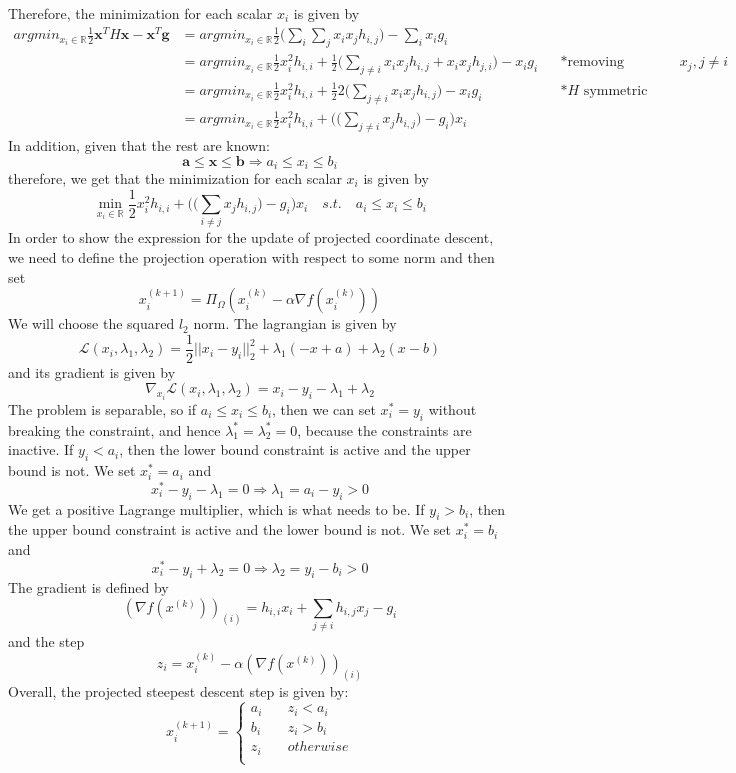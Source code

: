 \documentclass{article}
\begin{document}
\begin{enumerate}[(a)]
Therefore, the minimization for each scalar $x_i$ is given by
\begin{align*}
argmin_{x_i\in \mathbb{R}}\frac{1}{2}\mathbf{x}^TH \mathbf{x}-\mathbf{x}^T\mathbf{g}
&= argmin_{x_i\in \mathbb{R}}\frac{1}{2}\Big(\sum_i\sum_jx_ix_jh_{i,j}\Big)-\sum_ix_ig_i\\
&= argmin_{x_i\in \mathbb{R}}\frac{1}{2}x_i^2h_{i,i}+\frac{1}{2}\Big(\sum_{j\ne i}x_ix_jh_{i,j}+x_ix_jh_{j,i}\Big)-x_ig_i &&*\text{removing consants-$x_j, j\ne i$}\\
&= argmin_{x_i\in \mathbb{R}}\frac{1}{2}x_i^2h_{i,i}+\frac{1}{2}2\Big(\sum_{j\ne i}x_ix_jh_{i,j}\Big)-x_ig_i &&*\text{$H$ symmetric}\\
&= argmin_{x_i\in \mathbb{R}}\frac{1}{2}x_i^2h_{i,i}+\Big(\Big(\sum_{j\ne i}x_jh_{i,j}\Big)-g_i\Big)x_i
\end{align*}
In addition, given that the rest are known:
\[\mathbf{a}\le \mathbf{x}\le \mathbf{b} \Rightarrow a_i \le x_i \le b_i\]
therefore, we get  that the minimization for each scalar $x_i$ is given by
\[\min_{x_i\in \mathbb{R}}\frac{1}{2}x_i^2h_{i,i}+\Big(\Big(\sum_{i\ne j}x_jh_{i,j}\Big)-g_i\Big)x_i \quad s.t. \quad a_i \le x_i \le b_i\]
In order to show the expression for the update of projected coordinate descent, we need to define the projection operation with respect to some norm and then set
\[x_i^{(k+1)} = \Pi_\Omega (x_i^{(k)} -\alpha \nabla f(x_i^{(k)})) \]
We will choose the squared $l_2$ norm. The lagrangian is given by
\[\mathcal{L}(x_i, \lambda_1, \lambda_2) = \frac{1}{2}||x_i-y_i||_2^2+\lambda_1(-x+a)+\lambda_2(x-b)       \]
and its gradient is given by
\[  \nabla_{x_i} \mathcal{L}(x_i, \lambda_1, \lambda_2) = x_i-y_i -\lambda_1+\lambda_2     \]
The problem is separable, so if $a_i \le x_i \le b_i$, then we can set $x_i^* = y_i$ without breaking the constraint, and hence $\lambda_1^*=\lambda_2^*=0$, because the
constraints are inactive. If $y_i < a_i$, then the lower bound constraint is active and the upper bound is not. We set $x_i^* = a_i$ and
\[x_i^* - y_i-\lambda_1 = 0 \Rightarrow\lambda_1 = a_i-y_i > 0 \]
We get a positive Lagrange multiplier, which is what needs to be. If $y_i>b_i$, then the upper bound constraint is active and the lower bound is not. We set $x_i^* = b_i$ and
\[x_i^* - y_i+\lambda_2 = 0 \Rightarrow\lambda_2 = y_i-b_i > 0 \]
The gradient is defined by
\[(\nabla f (x^{(k)}))_{(i)} = h_{i,i}x_i+\sum_{j\ne i}  h_{i,j}x_j -g_i   \]
and the step
\[z_i =  x_i^{(k)}-\alpha (\nabla f (x^{(k)}))_{(i)}   \]
Overall, the projected steepest descent step is given by:
\[x_i^{(k+1)} =
\begin{cases}
a_i &\quad z_i <a_i\\
b_i &\quad z_i >b_i\\
z_i &\quad otherwise\\
\end{cases}
\]


\end{enumerate}
\end{document}
